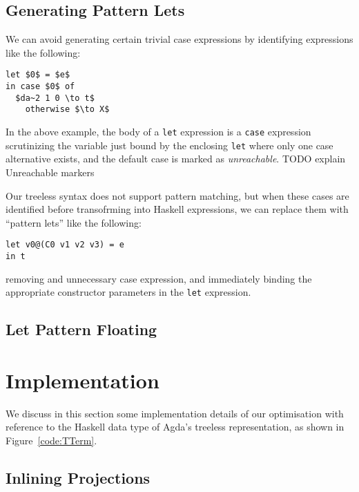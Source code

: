 \subsection{Generating Pattern Lets}

We can avoid generating certain trivial case expressions by identifying expressions like the following:

\begin{lstlisting}[style=math]
let $0$ = $e$
in case $0$ of
  $da~2 1 0 \to t$
	otherwise $\to X$
\end{lstlisting}

In the above example, the body of a \lstinline{let} expression is a \lstinline{case} expression scrutinizing the variable just bound by the enclosing \lstinline{let} where only one case alternative exists, and the default case is marked as \textit{unreachable}. TODO explain Unreachable markers

Our treeless syntax does not support pattern matching, but when these cases are identified before transofrming into Haskell expressions, we can replace them with ``pattern lets'' like the following:

\begin{lstlisting}
let v0@(C0 v1 v2 v3) = e
in t
\end{lstlisting}

removing and unnecessary case expression, and immediately binding the appropriate constructor parameters in the \lstinline{let} expression.

\subsection{Let Pattern Floating}

\section{Implementation}
\label{sec:implementation}

We discuss in this section some implementation details of our optimisation with reference to the Haskell data type of Agda's treeless representation, as shown in Figure~\ref{code:TTerm}.

\subsection{Inlining Projections}

